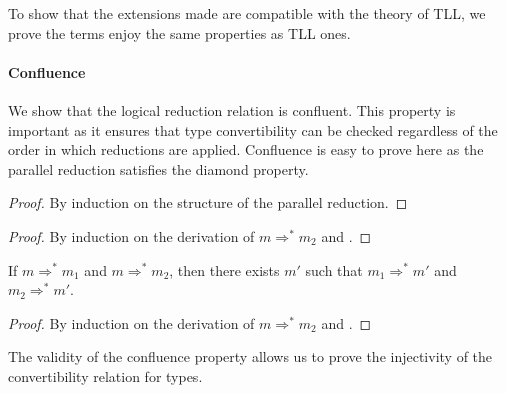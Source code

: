 To show that the \TLLC{} extensions made are compatible with the theory of TLL,
we prove the \TLLC{} terms enjoy the same properties as TLL ones. 

\paragraph{\textbf{Confluence}}
We show that the logical reduction relation is confluent. 
This property is important as it ensures that type convertibility can be checked
regardless of the order in which reductions are applied. 
Confluence is easy to prove here as the parallel reduction satisfies the diamond property.

\begin{proof}
  By induction on the structure of the parallel reduction.
\end{proof}

\begin{proof}
  By induction on the derivation of $m \Rightarrow^* m_2$ and .
\end{proof}

\begin{theorem}[Confluence]
  If $m \Rightarrow^* m_1$ and $m \Rightarrow^* m_2$, then there exists $m'$ such that
  $m_1 \Rightarrow^* m'$ and $m_2 \Rightarrow^* m'$.
\end{theorem}
\begin{proof}
  By induction on the derivation of $m \Rightarrow^* m_2$ and .
\end{proof}

The validity of the confluence property allows us to prove the injectivity of
the convertibility relation for types.



